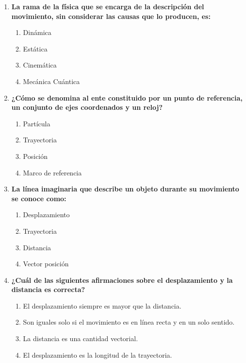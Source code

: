 \documentclass[12pt]{article}
\begin{document}
\begin{enumerate}[label=\arabic*.]
    \item \textbf{La rama de la física que se encarga de la descripción del movimiento, sin considerar las causas que lo producen, es:}
    \begin{enumerate}[label=\alph*)]
        \item Dinámica
        \item Estática
        \item Cinemática
        \item Mecánica Cuántica
    \end{enumerate}

    \item \textbf{¿Cómo se denomina al ente constituido por un punto de referencia, un conjunto de ejes coordenados y un reloj?}
    \begin{enumerate}[label=\alph*)]
        \item Partícula
        \item Trayectoria
        \item Posición
        \item Marco de referencia
    \end{enumerate}

    \item \textbf{La línea imaginaria que describe un objeto durante su movimiento se conoce como:}
    \begin{enumerate}[label=\alph*)]
        \item Desplazamiento
        \item Trayectoria
        \item Distancia
        \item Vector posición
    \end{enumerate}

    \item \textbf{¿Cuál de las siguientes afirmaciones sobre el desplazamiento y la distancia es correcta?}
    \begin{enumerate}[label=\alph*)]
        \item El desplazamiento siempre es mayor que la distancia.
        \item Son iguales solo si el movimiento es en línea recta y en un solo sentido.
        \item La distancia es una cantidad vectorial.
        \item El desplazamiento es la longitud de la trayectoria.
    \end{enumerate}


\end{enumerate}
\end{document}
